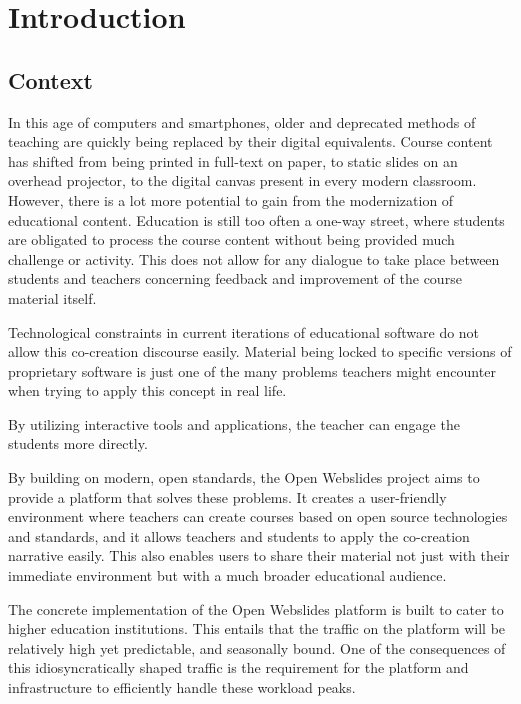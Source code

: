 
\chapter{Introduction}
\label{ch:introduction}

\section{Context}
\label{sec:context}

In this age of computers and smartphones, older and deprecated methods of teaching are quickly being replaced by their digital equivalents.
Course content has shifted from being printed in full-text on paper, to static slides on an overhead projector, to the digital canvas present in every modern classroom.
However, there is a lot more potential to gain from the modernization of educational content.
Education is still too often a one-way street, where students are obligated to process the course content without being provided much challenge or activity.
This does not allow for any dialogue to take place between students and teachers concerning feedback and improvement of the course material itself.

Technological constraints in current iterations of educational software do not allow this co-creation discourse easily.
Material being locked to specific versions of proprietary software is just one of the many problems teachers might encounter when trying to apply this concept in real life.

By utilizing interactive tools and applications, the teacher can engage the students more directly.

By building on modern, open standards, the Open Webslides project \autocite{OpenWebslides2017} aims to provide a platform that solves these problems.
It creates a user-friendly environment where teachers can create courses based on open source technologies and standards, and it allows teachers and students to apply the co-creation narrative easily.
This also enables users to share their material not just with their immediate environment but with a much broader educational audience.

The concrete implementation of the Open Webslides platform is built to cater to higher education institutions.
This entails that the traffic on the platform will be relatively high yet predictable, and seasonally bound.
One of the consequences of this idiosyncratically shaped traffic is the requirement for the platform and infrastructure to efficiently handle these workload peaks.


